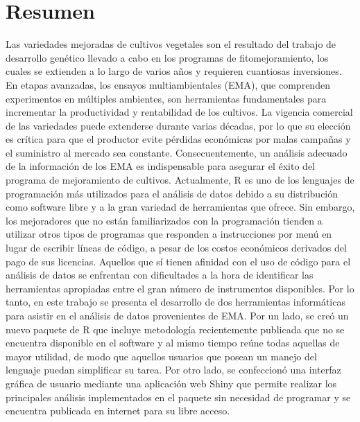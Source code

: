  
\chapter*{Resumen}

Las variedades mejoradas de cultivos vegetales son el resultado del trabajo de desarrollo genético llevado a cabo en los programas de fitomejoramiento, los cuales se extienden a lo largo de varios años y requieren cuantiosas inversiones. En etapas avanzadas, los ensayos multiambientales (EMA), que comprenden experimentos en múltiples ambientes, son herramientas fundamentales para incrementar la productividad y rentabilidad de los cultivos. La vigencia comercial de las variedades puede extenderse durante varias décadas, por lo que su elección es crítica para que el productor evite pérdidas económicas por malas campañas y el suministro al mercado sea constante. Consecuentemente, un análisis adecuado de la información de los EMA es indispensable para asegurar el éxito del programa de mejoramiento de cultivos. Actualmente, R es uno de los lenguajes de programación más utilizados para el análisis de datos debido a su distribución como software libre y a la gran variedad de herramientas que ofrece. Sin embargo, los mejoradores que no están familiarizados con la programación tienden a utilizar otros tipos de programas que responden a instrucciones por menú en lugar de escribir líneas de código, a pesar de los costos económicos derivados del pago de sus licencias. Aquellos que sí tienen afinidad con el uso de código para el análisis de datos se enfrentan con dificultades a la hora de identificar las herramientas apropiadas entre el gran número de instrumentos disponibles. Por lo tanto, en este trabajo se presenta el desarrollo de dos herramientas informáticas para asistir en el análisis de datos provenientes de EMA. Por un lado, se creó un nuevo paquete de R que incluye metodología recientemente publicada que no se encuentra disponible en el software y al mismo tiempo reúne todas aquellas de mayor utilidad, de modo que aquellos usuarios que posean un manejo del lenguaje puedan simplificar su tarea. Por otro lado, se confeccionó una interfaz gráfica de usuario mediante una aplicación web Shiny que permite realizar los principales análisis implementados en el paquete sin necesidad de programar y se encuentra publicada en internet para su libre acceso.


